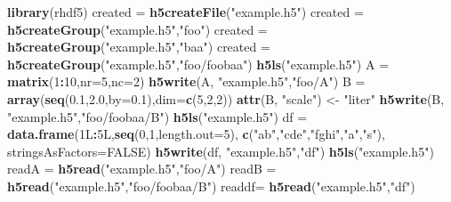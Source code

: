 \documentclass[]{book}
\newenvironment{Shaded}{\begin{snugshade}}{\end{snugshade}}
\newcommand{\DataTypeTok}[1]{\textcolor[rgb]{0.13,0.29,0.53}{#1}}
\newcommand{\DecValTok}[1]{\textcolor[rgb]{0.00,0.00,0.81}{#1}}
\newcommand{\FloatTok}[1]{\textcolor[rgb]{0.00,0.00,0.81}{#1}}
\newcommand{\KeywordTok}[1]{\textcolor[rgb]{0.13,0.29,0.53}{\textbf{#1}}}
\newcommand{\NormalTok}[1]{#1}
\newcommand{\OperatorTok}[1]{\textcolor[rgb]{0.81,0.36,0.00}{\textbf{#1}}}
\newcommand{\OtherTok}[1]{\textcolor[rgb]{0.56,0.35,0.01}{#1}}
\newcommand{\StringTok}[1]{\textcolor[rgb]{0.31,0.60,0.02}{#1}}
\begin{document}
\begin{Shaded}
\begin{Highlighting}[]
\KeywordTok{library}\NormalTok{(rhdf5)}
\NormalTok{created =}\StringTok{ }\KeywordTok{h5createFile}\NormalTok{(}\StringTok{"example.h5"}\NormalTok{)}
\NormalTok{created =}\StringTok{ }\KeywordTok{h5createGroup}\NormalTok{(}\StringTok{"example.h5"}\NormalTok{,}\StringTok{"foo"}\NormalTok{)}
\NormalTok{created =}\StringTok{ }\KeywordTok{h5createGroup}\NormalTok{(}\StringTok{"example.h5"}\NormalTok{,}\StringTok{"baa"}\NormalTok{)}
\NormalTok{created =}\StringTok{ }\KeywordTok{h5createGroup}\NormalTok{(}\StringTok{"example.h5"}\NormalTok{,}\StringTok{"foo/foobaa"}\NormalTok{)}
\KeywordTok{h5ls}\NormalTok{(}\StringTok{"example.h5"}\NormalTok{)}
\NormalTok{A =}\StringTok{ }\KeywordTok{matrix}\NormalTok{(}\DecValTok{1}\OperatorTok{:}\DecValTok{10}\NormalTok{,}\DataTypeTok{nr=}\DecValTok{5}\NormalTok{,}\DataTypeTok{nc=}\DecValTok{2}\NormalTok{)}
\KeywordTok{h5write}\NormalTok{(A, }\StringTok{"example.h5"}\NormalTok{,}\StringTok{"foo/A"}\NormalTok{)}
\NormalTok{B =}\StringTok{ }\KeywordTok{array}\NormalTok{(}\KeywordTok{seq}\NormalTok{(}\FloatTok{0.1}\NormalTok{,}\FloatTok{2.0}\NormalTok{,}\DataTypeTok{by=}\FloatTok{0.1}\NormalTok{),}\DataTypeTok{dim=}\KeywordTok{c}\NormalTok{(}\DecValTok{5}\NormalTok{,}\DecValTok{2}\NormalTok{,}\DecValTok{2}\NormalTok{))}
\KeywordTok{attr}\NormalTok{(B, }\StringTok{"scale"}\NormalTok{) <-}\StringTok{ "liter"}
\KeywordTok{h5write}\NormalTok{(B, }\StringTok{"example.h5"}\NormalTok{,}\StringTok{"foo/foobaa/B"}\NormalTok{)}
\KeywordTok{h5ls}\NormalTok{(}\StringTok{"example.h5"}\NormalTok{)}
\NormalTok{df =}\StringTok{ }\KeywordTok{data.frame}\NormalTok{(1L}\OperatorTok{:}\NormalTok{5L,}\KeywordTok{seq}\NormalTok{(}\DecValTok{0}\NormalTok{,}\DecValTok{1}\NormalTok{,}\DataTypeTok{length.out=}\DecValTok{5}\NormalTok{),}
  \KeywordTok{c}\NormalTok{(}\StringTok{"ab"}\NormalTok{,}\StringTok{"cde"}\NormalTok{,}\StringTok{"fghi"}\NormalTok{,}\StringTok{"a"}\NormalTok{,}\StringTok{"s"}\NormalTok{), }\DataTypeTok{stringsAsFactors=}\OtherTok{FALSE}\NormalTok{)}
\KeywordTok{h5write}\NormalTok{(df, }\StringTok{"example.h5"}\NormalTok{,}\StringTok{"df"}\NormalTok{)}
\KeywordTok{h5ls}\NormalTok{(}\StringTok{"example.h5"}\NormalTok{)}
\NormalTok{readA =}\StringTok{ }\KeywordTok{h5read}\NormalTok{(}\StringTok{"example.h5"}\NormalTok{,}\StringTok{"foo/A"}\NormalTok{)}
\NormalTok{readB =}\StringTok{ }\KeywordTok{h5read}\NormalTok{(}\StringTok{"example.h5"}\NormalTok{,}\StringTok{"foo/foobaa/B"}\NormalTok{)}
\NormalTok{readdf=}\StringTok{ }\KeywordTok{h5read}\NormalTok{(}\StringTok{"example.h5"}\NormalTok{,}\StringTok{"df"}\NormalTok{)}
\end{Highlighting}
\end{Shaded}
\end{document}
